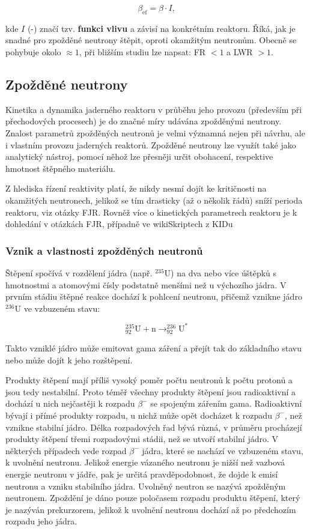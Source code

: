 \begin{equation}
  \beta_{\text{ef}} = \beta \cdot I,
\end{equation}

kde $I$ (-) značí tzv. \textbf{funkci vlivu} a závisí na konkrétním reaktoru. Říká, jak je snadné pro zpožděné neutrony štěpit, oproti okamžitým neutronům. Obecně se pohybuje okolo $\approx 1$, při bližším studiu lze napsat: FR $<1$ a LWR $>1$.\\


\subsection{Zpožděné neutrony}

Kinetika a dynamika jaderného reaktoru v průběhu jeho provozu (především při přechodových procesech) je do značné míry udávána zpožděnými neutrony. Znalost parametrů zpožděných neutronů je velmi významná nejen při návrhu, ale i vlastním provozu jaderných reaktorů. Zpožděné neutrony lze využít také jako analytický nástroj, pomocí něhož lze přesněji určit obohacení, respektive hmotnost štěpného materiálu.

Z hlediska řízení reaktivity platí, že nikdy nesmí dojít ke kritičnosti na okamžitých neutronech, jelikož se tím drasticky (až o několik řádů) sníží perioda reaktoru, viz otázky FJR. Rovněž více o kinetických parametrech reaktoru je k dohledání v otázkách FJR, případně ve wikiSkriptech z KIDu

\subsubsection{Vznik a vlastnosti zpožděných neutronů}

Štěpení spočívá v rozdělení jádra (např. $^{235}\text{U}$) na dva nebo více úštěpků s hmotnostmi a atomovými čísly podstatně menšími než u výchozího jádra. V prvním stádiu štěpné reakce dochází k pohlcení neutronu, přičemž vznikne jádro $^{236}\text{U}$ ve vzbuzeném stavu:

\[
^{235}_{92}\text{U} + \text{n} \rightarrow ^{236}_{92}\text{U}^*
\]

Takto vzniklé jádro může emitovat gama záření a přejít tak do základního stavu nebo může dojít k jeho rozštěpení. 

Produkty štěpení mají příliš vysoký poměr počtu neutronů k počtu protonů a jsou tedy nestabilní. Proto téměř všechny produkty štěpení jsou radioaktivní a dochází u nich nejčastěji k rozpadu $\beta^-$ se spojeným zářením gama. Radioaktivní bývají i přímé produkty rozpadu, u nichž může opět docházet k rozpadu $\beta^-$, než vznikne stabilní jádro. Délka rozpadových řad bývá různá, v průměru procházejí produkty štěpení třemi rozpadovými stádii, než se utvoří stabilní jádro. V některých případech vede rozpad $\beta^-$ jádra, které se nachází ve vzbuzeném stavu, k uvolnění neutronu. Jelikož energie vázaného neutronu je nižší než vazbová energie neutronu v jádře, pak je určitá pravděpodobnost, že dojde k emisí neutronu a vzniku stabilního jádra. Uvolněný neutron se nazývá zpožděným neutronem. Zpoždění je dáno pouze poločasem rozpadu produktu štěpení, který je nazýván prekurzorem, jelikož k uvolnění neutronu dochází až po předchozím rozpadu jeho jádra.

